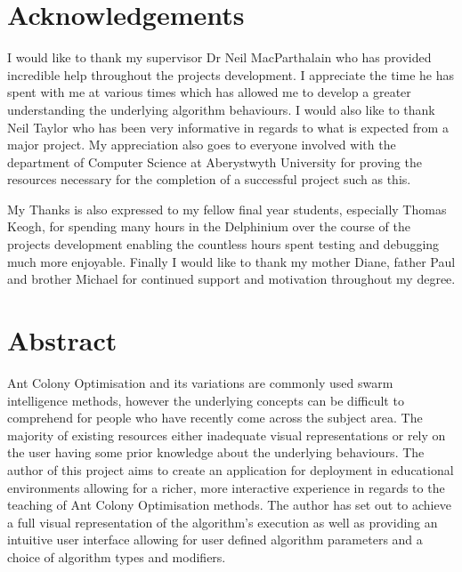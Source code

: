 \documentclass[10pt,a4paper]{article}
\begin{document}
\section*{Acknowledgements}

I would like to thank my supervisor Dr Neil MacParthalain who has provided incredible help throughout the projects development. I appreciate the time he has spent with me at various times which has allowed me to develop a greater understanding the underlying algorithm behaviours. I would also like to thank Neil Taylor who has been very informative in regards to what is expected from a major project. My appreciation also goes to everyone involved with the department of Computer Science at Aberystwyth University for proving the resources necessary for the completion of a successful project such as this.

My Thanks is also expressed to my fellow final year students, especially Thomas Keogh, for spending many hours in the Delphinium over the course of the projects development enabling the countless hours spent testing and debugging much more enjoyable. Finally I would like to thank my mother Diane, father Paul and brother Michael for continued support and motivation throughout my degree.

\clearpage

\section*{Abstract}

Ant Colony Optimisation and its variations are commonly used swarm intelligence methods, however the underlying concepts can be difficult to comprehend for people who have recently come across the subject area. The majority of existing resources either inadequate visual representations or rely on the user having some prior knowledge about the underlying behaviours. The author of this project aims to create an application for deployment in educational environments allowing for a richer, more interactive experience in regards to the teaching of Ant Colony Optimisation methods. The author has set out to achieve a full visual representation of the algorithm's execution as well as providing an intuitive user interface allowing for user defined algorithm parameters and a choice of algorithm types and modifiers.
\end{document}
